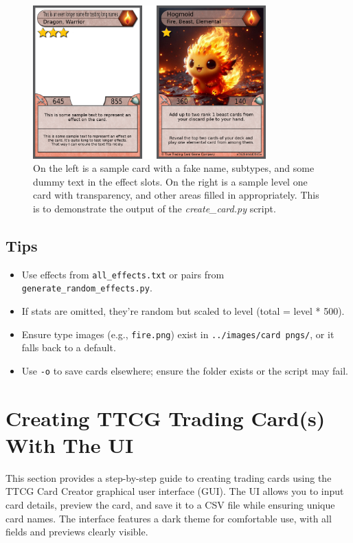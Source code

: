 \begin{figure}[h]
	\centering
	\includegraphics[width=0.8\textwidth]{images/sample_generated_output.png} 
	\caption{On the left is a sample card with a fake name, subtypes, and some dummy text in the effect slots. On the right is a sample level one card with transparency, and other areas filled in appropriately. This is to demonstrate the output of the \textit{create\_card.py} script.}
	\label{fig:sample_generated_output}
\end{figure}

\subsection{Tips}
\begin{itemize}
	\item Use effects from \texttt{all\_effects.txt} or pairs from \texttt{generate\_random\_effects.py}.
	\item If stats are omitted, they’re random but scaled to level (total = level * 500).
	\item Ensure type images (e.g., \texttt{fire.png}) exist in \texttt{../images/card pngs/}, or it falls back to a default.
	\item Use \texttt{-o} to save cards elsewhere; ensure the folder exists or the script may fail.
\end{itemize}










\section{Creating TTCG Trading Card(s) With The UI}

This section provides a step-by-step guide to creating trading cards using the TTCG Card Creator graphical user interface (GUI). The UI allows you to input card details, preview the card, and save it to a CSV file while ensuring unique card names. The interface features a dark theme for comfortable use, with all fields and previews clearly visible.

